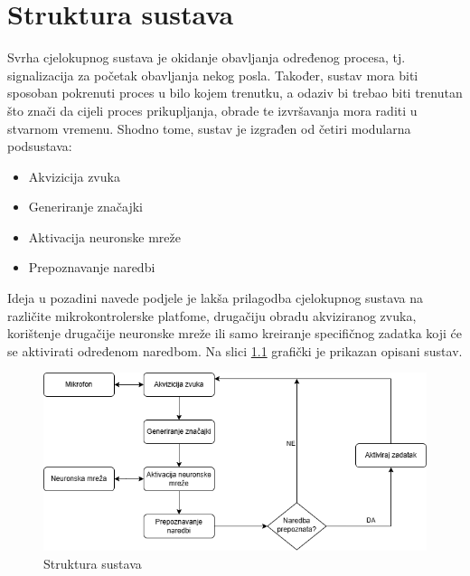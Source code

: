 \chapter{Struktura sustava}
\label{pog:struktura_sustava}

Svrha cjelokupnog sustava je okidanje obavljanja određenog procesa, tj. signalizacija
za početak obavljanja nekog posla. Također, sustav mora biti sposoban pokrenuti
proces u bilo kojem trenutku, a odaziv bi trebao biti trenutan što
znači da cijeli proces prikupljanja, obrade te izvršavanja mora raditi
u stvarnom vremenu. Shodno tome, sustav je izgrađen od četiri modularna
podsustava:

\begin{itemize}
    \item Akvizicija zvuka
    \item Generiranje značajki
    \item Aktivacija neuronske mreže
    \item Prepoznavanje naredbi
\end{itemize}

Ideja u pozadini navede podjele je lakša prilagodba cjelokupnog
sustava na različite mikrokontrolerske platfome, drugačiju obradu
akviziranog zvuka, korištenje drugačije neuronske mreže ili samo 
kreiranje specifičnog zadatka koji će se aktivirati određenom naredbom.
Na slici \ref{pic:struktura_sustava} grafički je prikazan opisani sustav.

\begin{figure}[htb]
    \centering
    \includegraphics[width=0.6\linewidth]{Chapters/struktura_sustava/struktura_sustava.png} 
    \caption{Struktura sustava \cite{flowchart}}
    \label{pic:struktura_sustava}
\end{figure}






